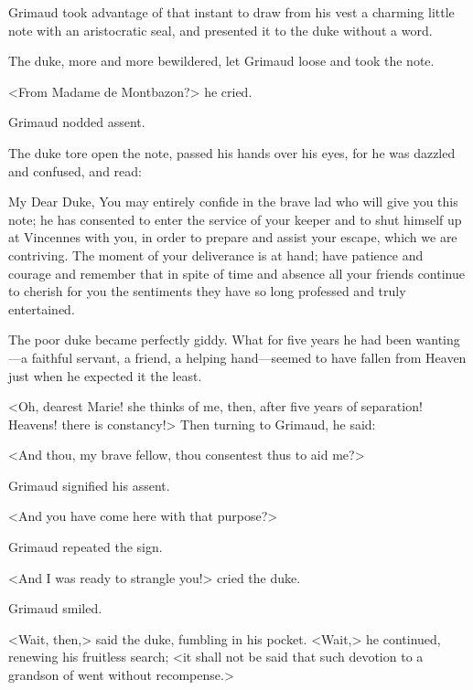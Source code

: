 Grimaud took advantage of that instant to draw from his vest a charming little note with an aristocratic seal, and presented it to the duke without a word.

The duke, more and more bewildered, let Grimaud loose and took the note.

<From Madame de Montbazon?> he cried.

Grimaud nodded assent.

The duke tore open the note, passed his hands over his eyes, for he was dazzled and confused, and read:  

\begin{mail}{}{My Dear Duke,}
You may entirely confide in the brave lad who will give you this note; he has consented to enter the service of your keeper and to shut himself up at Vincennes with you, in order to prepare and assist your escape, which we are contriving. The moment of your deliverance is at hand; have patience and courage and remember that in spite of time and absence all your friends continue to cherish for you the sentiments they have so long professed and truly entertained.  

\end{mail}

The poor duke became perfectly giddy. What for five years he had been wanting—a faithful servant, a friend, a helping hand—seemed to have fallen from Heaven just when he expected it the least.

<Oh, dearest Marie! she thinks of me, then, after five years of separation! Heavens! there is constancy!> Then turning to Grimaud, he said:

<And thou, my brave fellow, thou consentest thus to aid me?>

Grimaud signified his assent.

<And you have come here with that purpose?>

Grimaud repeated the sign.

<And I was ready to strangle you!> cried the duke.

Grimaud smiled.

<Wait, then,> said the duke, fumbling in his pocket. <Wait,> he continued, renewing his fruitless search; <it shall not be said that such devotion to a grandson of  went without recompense.>

